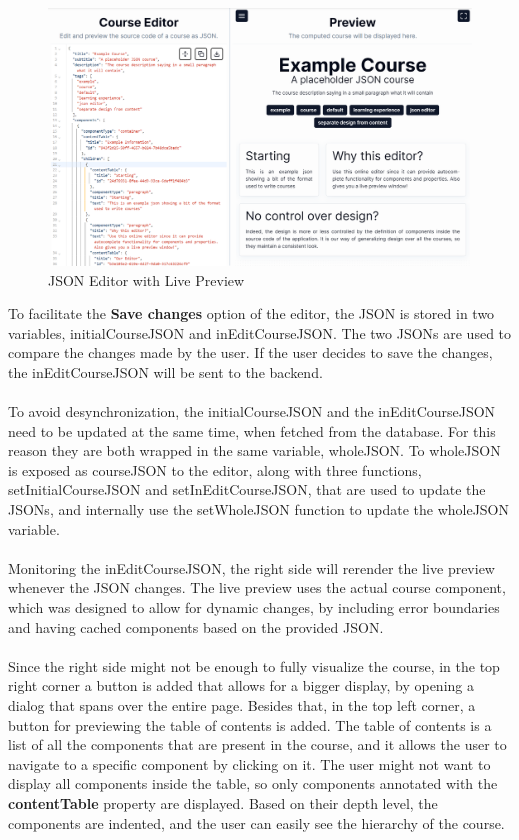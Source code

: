 \begin{figure}[h]
    \centering
    \includegraphics[scale=0.45]{images/live-preview-editor.png}
    \caption{JSON Editor with Live Preview}
    \label{fig:live-preview-editor}
\end{figure}
\newpage
\noindent To facilitate the \textbf{Save changes} option of the editor, the JSON is stored in two variables, initialCourseJSON and inEditCourseJSON. The two JSONs are used to compare the changes made by the user. If the user decides to save the changes, the inEditCourseJSON will be sent to the backend.
\\\\
\noindent To avoid desynchronization, the initialCourseJSON and the inEditCourseJSON need to be updated at the same time, when fetched from the database. For this reason they are both wrapped in the same variable, wholeJSON. To wholeJSON is exposed as courseJSON to the editor, along with three functions, setInitialCourseJSON and setInEditCourseJSON, that are used to update the JSONs, and internally use the setWholeJSON function to update the wholeJSON variable.
\\\\
\noindent Monitoring the inEditCourseJSON, the right side will rerender the live preview whenever the JSON changes. The live preview uses the actual course component, which was designed to allow for dynamic changes, by including error boundaries and having cached components based on the provided JSON.
\\\\
\noindent Since the right side might not be enough to fully visualize the course, in the top right corner a button is added that allows for a bigger display, by opening a dialog that spans over the entire page. Besides that, in the top left corner, a button for previewing the table of contents is added. The table of contents is a list of all the components that are present in the course, and it allows the user to navigate to a specific component by clicking on it. The user might not want to display all components inside the table, so only components annotated with the \textbf{contentTable} property are displayed. Based on their depth level, the components are indented, and the user can easily see the hierarchy of the course.


